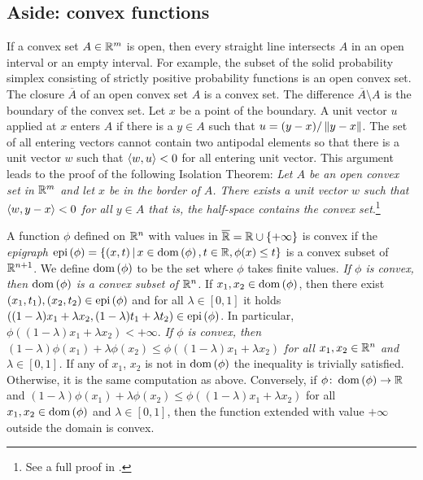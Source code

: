 \documentclass[12pt,a4paper]{amsart}
\theoremstyle{plain}%
\theoremstyle{definition}
\theoremstyle{remark}
\begin{document}
\subsection{Aside: convex functions}

If a convex set $A \in \mathbb{R}^m$ is open, then every straight line intersects $A$ in an open interval or an empty interval. For example, the subset of the solid probability simplex consisting of strictly positive probability functions is an open convex set. The closure $\overline A$ of an open convex set $A$ is a convex set. The difference $\overline A \setminus A$ is the boundary of the convex set. Let $x$ be a point of the boundary. A unit vector $u$ applied at $x$ enters $A$ if there is a $y \in A$ such that $u = (y-x)/\left\Vert y-x\right\Vert$. The set of all entering vectors cannot contain two antipodal elements so that there is a unit vector $w$ such that $\left\langle w,u\right\rangle < 0$ for all entering unit vector. This argument leads to the proof of the following Isolation Theorem: \emph{Let $A$ be an open convex set in $\mathbb{R}^m$ and let $x$ be in the border of $A$. There exists a unit vector $w$ such that  $\left\langle w,y-x\right\rangle < 0$ for all $y \in A$ that is, the half-space contains the convex set}.\footnote{See a full proof in \cite[p 45-46]{barvinok:2002}.}

A function $\phi$ defined on $\mathbb{R}^n$ with values in $\overline{\mathbb{R}} = \mathbb{R} \cup \left\{+\infty\right\}$ is convex if the \emph{epigraph} $\operatorname{epi}\left(\phi\right) = \left\{(x,t) \, \middle| \,  x \in \operatorname{dom}\left(\phi\right), t \in \mathbb{R}, \phi(x) \leq t \right\}$ is a convex subset of $\mathbb{R}^{n+1}$. We define $\operatorname{dom}\left(\phi\right)$ to be the set where $\phi$ takes finite values. \emph{If $\phi$ is convex, then $\operatorname{dom}\left(\phi\right)$ is a convex subset of $\mathbb{R}^n$.} If $x_1,x_2 \in \operatorname{dom}\left(\phi\right)$, then there exist $(x_1,t_1), (x_2,t_2) \in \operatorname{epi}\left(\phi\right)$ and for all $\lambda \in [0,1]$ it holds $((1-\lambda)x_1+\lambda x_2,(1-\lambda)t_1+\lambda t_2) \in \operatorname{epi}\left(\phi\right)$. In particular, $\phi((1-\lambda)x_1+\lambda x_2) < + \infty$. \emph{If $\phi$ is  convex, then $(1-\lambda)\phi(x_1) + \lambda \phi(x_2) \leq \phi((1-\lambda)x_1+\lambda x_2)$ for all $x_1,x_2 \in \mathbb{R}^n$ and $\lambda \in [0,1]$.} If any of $x_1$, $x_2$ is not in $\operatorname{dom}\left(\phi\right)$ the inequality is trivially satisfied. Otherwise, it is the same computation as above. Conversely, if $\phi \colon \operatorname{dom}\left(\phi\right) \to \mathbb{R}$ and $(1-\lambda)\phi(x_1) + \lambda \phi(x_2) \leq \phi((1-\lambda)x_1+\lambda x_2)$ for all $x_1,x_2 \in \operatorname{dom}\left(\phi\right)$ and $\lambda \in [0,1]$, then the function extended with value $+\infty$ outside the domain is convex.
\end{document}
